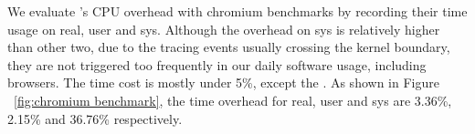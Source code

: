 
We evaluate \xxx's CPU overhead with chromium benchmarks by recording their
time usage on real, user and sys. Although the overhead on sys is relatively
higher than other two, due to the tracing events usually crossing the
kernel boundary, they are not triggered too frequently in our daily software
usage, including browsers. The time cost is mostly under 5\%, except the
. As shown in Figure ~\ref{fig:chromium
benchmark}, the time overhead for real, user and sys are 3.36\%, 2.15\% and 36.76\%
respectively.
